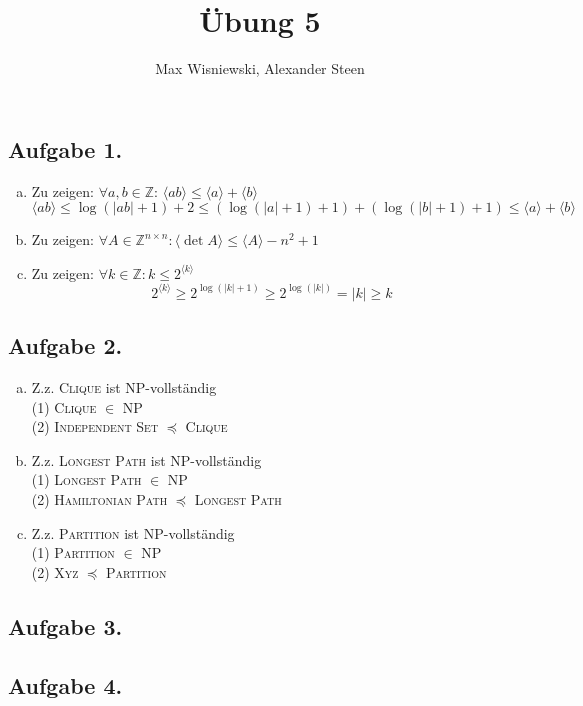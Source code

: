 \documentclass[11pt,a4paper,ngerman]{article}
\date{}
\title{Übung 5}
\author{Max Wisniewski, Alexander Steen}
\newcommand{\code}[1]{\langle {#1} \rangle}
\newcommand{\Z}{\mathbb{Z}}
\begin{document}

\renewcommand{\figurename}{Figure}

\maketitle
\thispagestyle{fancy}

\subsection*{Aufgabe 1.}
\begin{enumerate}[a)]
\item Zu zeigen: $\forall a,b \in \Z: \, \code{ab} \leq \code{a} + \code{b}$ 
\begin{equation*}
 \code{ab} \leq \log(|ab| + 1)+2 \leq (\log(|a|+1)+1) + (\log(|b|+1)+1) \leq \code{a} + \code{b}
\end{equation*}
\item Zu zeigen: $\forall A \in \Z^{n \times n}: \code{\det A} \leq \code{A} - n^2 + 1$ \\
\item Zu zeigen: $\forall k \in \Z: k \leq 2^{\code{k}}$ \\
\begin{equation*}
2^{\code{k}} \geq 2^{\log(|k| + 1)} \geq 2^{\log(|k|)} = |k| \geq k
\end{equation*}
\end{enumerate}
\subsection*{Aufgabe 2.}
\begin{enumerate}[a)]
\item Z.z. \textsc{Clique} ist NP-vollständig \\
(1) \textsc{Clique} $\in$ NP \\
(2) \textsc{Independent Set} $\preceq$ \textsc{Clique} \\
\item Z.z. \textsc{Longest Path} ist NP-vollständig \\
(1) \textsc{Longest Path} $\in$ NP \\
(2) \textsc{Hamiltonian Path} $\preceq$ \textsc{Longest Path} \\
\item Z.z. \textsc{Partition} ist NP-vollständig \\
(1) \textsc{Partition} $\in$ NP \\
(2) \textsc{Xyz} $\preceq$ \textsc{Partition} \\
\end{enumerate}
\subsection*{Aufgabe 3.}
\subsection*{Aufgabe 4.}


\label{LastPage}
\end{document}

